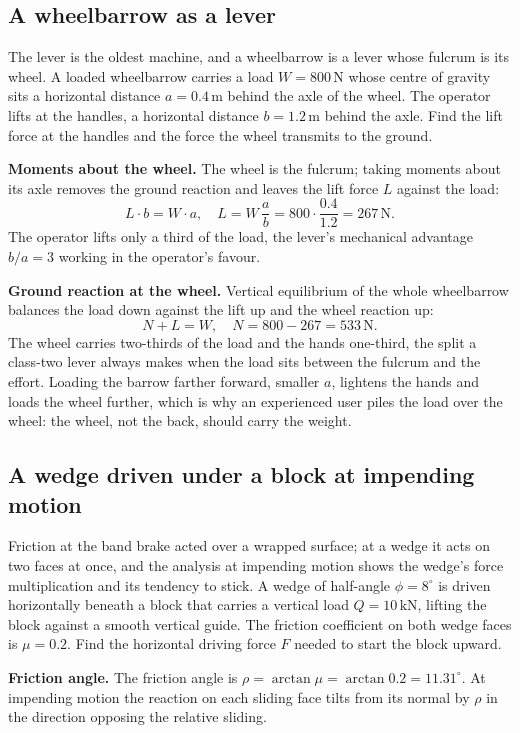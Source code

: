 \subsection{A wheelbarrow as a lever}

The lever is the oldest machine, and a wheelbarrow is a lever whose fulcrum is
its wheel. A loaded wheelbarrow carries a load $W = 800\,\text{N}$ whose
centre of gravity sits a horizontal distance $a = 0.4\,\si{\meter}$ behind the
axle of the wheel. The operator lifts at the handles, a horizontal distance
$b = 1.2\,\si{\meter}$ behind the axle. Find the lift force at the handles and
the force the wheel transmits to the ground.

\textbf{Moments about the wheel.} The wheel is the fulcrum; taking moments
about its axle removes the ground reaction and leaves the lift force $L$
against the load:
\[
L \cdot b = W \cdot a, \quad
L = W\,\frac{a}{b} = 800 \cdot \frac{0.4}{1.2} = 267\,\text{N}.
\]
The operator lifts only a third of the load, the lever's mechanical advantage
$b/a = 3$ working in the operator's favour.

\textbf{Ground reaction at the wheel.} Vertical equilibrium of the whole
wheelbarrow balances the load down against the lift up and the wheel reaction
up:
\[
N + L = W, \quad N = 800 - 267 = 533\,\text{N}.
\]
The wheel carries two-thirds of the load and the hands one-third, the split a
class-two lever always makes when the load sits between the fulcrum and the
effort. Loading the barrow farther forward, smaller $a$, lightens the hands
and loads the wheel further, which is why an experienced user piles the load
over the wheel: the wheel, not the back, should carry the weight.

\subsection{A wedge driven under a block at impending motion}

Friction at the band brake acted over a wrapped surface; at a wedge it acts on
two faces at once, and the analysis at impending motion shows the wedge's force
multiplication and its tendency to stick. A wedge of half-angle
$\phi = 8^{\circ}$ is driven horizontally beneath a block that carries a
vertical load $Q = 10\,\text{kN}$, lifting the block against a smooth vertical
guide. The friction coefficient on both wedge faces is $\mu = 0.2$. Find the
horizontal driving force $F$ needed to start the block upward.

\textbf{Friction angle.} The friction angle is $\rho = \arctan\mu =
\arctan 0.2 = 11.31^{\circ}$. At impending motion the reaction on each
sliding face tilts from its normal by $\rho$ in the direction opposing the
relative sliding.

